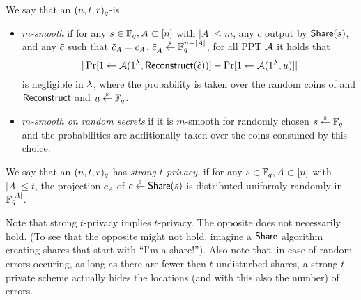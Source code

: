 \begin{definition}[Smoothness]\label{def:smoothness}
 We say that an $(n,t,r)_q$-\RSS is
	\begin{itemize}
	\item \emph{$m$-smooth} if for any $s\in\mathbb{F}_q, A \subset [n]$ with $|A|\leq m$, any $c$ output by $\mathsf{Share}(s)$, and any $\tilde{c}$ such that $\tilde{c}_A = c_A$, $\tilde{c}_{\bar A}\stackrel{{}_\$}{\leftarrow} \mathbb{F}_q^{n-|A|}$, for all PPT $\mathcal{A}$ it holds that  
	\[|\Pr[1\gets\mathcal{A}(1^{\lambda},
	\mathsf{Reconstruct}(\tilde{c}))]-\Pr[1\gets\mathcal{A}(1^{\lambda},
	u)]|\]
	is negligible in $\lambda$, where the probability is taken over the random coins of \AdvA and $\mathsf{Reconstruct}$ and $u\stackrel{{}_\$}{\leftarrow}\mathbb{F}_q$.
	 \item \emph{$m$-smooth on random secrets} if it is $m$-smooth for randomly chosen $s\stackrel{{}_\$}{\leftarrow}\mathbb{F}_q$ and the probabilities are additionally taken over the coins consumed by this choice.
	\end{itemize}
\end{definition}

\begin{definition}\label{def:strongprivacy}
 We say that an $(n,t,r)_q$-\RSS has \emph{strong $t$-privacy}, if for any $s\in\mathbb{F}_q, A\subset [n]$ with $|A|\leq t$, the projection $c_A$ of $c\stackrel{{}_\$}{\leftarrow}\mathsf{Share}(s)$ is distributed uniformly randomly in $\mathbb{F}_q^{|A|}$.
\end{definition}
Note that strong $t$-privacy implies $t$-privacy. 
The opposite does not necessarily hold. 
(To see that the opposite might not hold, imagine a $\mathsf{Share}$ algorithm creating shares that start with ``I'm a share!''). Also note that, in case of random errors occuring, as long as there are fewer then $t$ undisturbed shares, a strong $t$-private scheme actually hides the locations (and with this also the number) of errors.


% 


